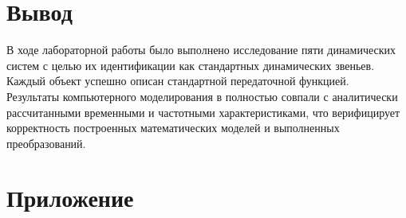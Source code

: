 \documentclass[a5paper, 10pt]{article}
\theoremstyle{definition}
\theoremstyle{plain}
\theoremstyle{remark}
\begin{document}
\section{Вывод}

В ходе лабораторной работы было выполнено исследование пяти динамических систем с целью их идентификации как стандартных динамических звеньев. \\
Каждый объект успешно описан стандартной передаточной функцией.\\
Результаты компьютерного моделирования в полностью совпали с аналитически рассчитанными временными и частотными характеристиками, что верифицирует корректность построенных математических моделей и выполненных преобразований.

\section{Приложение}
\end{document}
